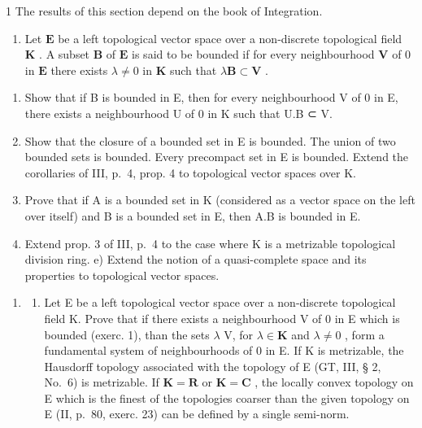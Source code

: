 1 The results of this section depend on the book of Integration.

\exercisesheading
\exercisegroup

\begin{enumerate}
\def\labelenumi{\arabic{enumi})}
\tightlist
\item
  Let \(\mathbf{E}\) be a left topological vector space over a non-discrete topological field \(\mathbf{K}\) . A subset \(\mathbf{B}\) of \(\mathbf{E}\) is said to be bounded if for every neighbourhood \(\mathbf{V}\) of 0 in \(\mathbf{E}\) there exists \(\lambda \neq 0\) in \(\mathbf{K}\) such that \(\lambda \mathbf{B} \subset \mathbf{V}\) .
\end{enumerate}

\begin{enumerate}
\def\labelenumi{\alph{enumi})}
\item
  Show that if B is bounded in E, then for every neighbourhood V of 0 in E, there exists a neighbourhood U of 0 in K such that U.B ⊂ V.
\item
  Show that the closure of a bounded set in E is bounded. The union of two bounded sets is bounded. Every precompact set in E is bounded. Extend the corollaries of III, p.~4, prop. 4 to topological vector spaces over K.
\item
  Prove that if A is a bounded set in K (considered as a vector space on the left over itself) and B is a bounded set in E, then A.B is bounded in E.
\item
  Extend prop. 3 of III, p.~4 to the case where K is a metrizable topological division ring. e) Extend the notion of a quasi-complete space and its properties to topological vector spaces.
\end{enumerate}

\begin{enumerate}
\def\labelenumi{\arabic{enumi})}
\setcounter{enumi}{1}
\tightlist
\item
  \begin{enumerate}
  \def\labelenumii{\alph{enumii})}
  \tightlist
  \item
    Let E be a left topological vector space over a non-discrete topological field K. Prove that if there exists a neighbourhood V of 0 in E which is bounded (exerc. 1), than the sets \(\lambda\) V, for \(\lambda \in \mathbf{K}\) and \(\lambda \neq 0\) , form a fundamental system of neighbourhoods of 0 in E. If K is metrizable, the Hausdorff topology associated with the topology of E (GT, III, § 2, No.~6) is metrizable. If \(\mathbf{K} = \mathbf{R}\) or \(\mathbf{K} = \mathbf{C}\) , the locally convex topology on E which is the finest of the topologies coarser than the given topology on E (II, p.~80, exerc. 23) can be defined by a single semi-norm.
  \end{enumerate}
\end{enumerate}

